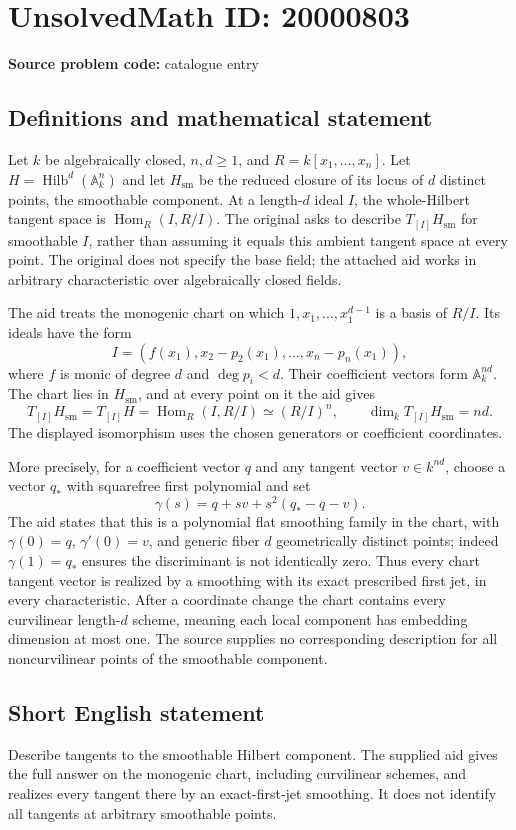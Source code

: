 \documentclass[11pt]{article}
\begin{document}
\section*{UnsolvedMath ID: 20000803}
\textbf{Source problem code:} catalogue entry
\subsection{Definitions and mathematical statement}
Let $k$ be algebraically closed, $n,d\ge1$, and $R=k[x_1,\ldots,x_n]$. Let $H=\operatorname{Hilb}^d(\mathbb A_k^n)$ and let $H_{\mathrm{sm}}$ be the reduced closure of its locus of $d$ distinct points, the smoothable component. At a length-$d$ ideal $I$, the whole-Hilbert tangent space is $\operatorname{Hom}_R(I,R/I)$. The original asks to describe $T_{[I]}H_{\mathrm{sm}}$ for smoothable $I$, rather than assuming it equals this ambient tangent space at every point. The original does not specify the base field; the attached aid works in arbitrary characteristic over algebraically closed fields.

The aid treats the monogenic chart on which $1,x_1,\ldots,x_1^{d-1}$ is a basis of $R/I$. Its ideals have the form
\[
I=(f(x_1),x_2-p_2(x_1),\ldots,x_n-p_n(x_1)),
\]
where $f$ is monic of degree $d$ and $\deg p_i<d$. Their coefficient vectors form $\mathbb A_k^{nd}$. The chart lies in $H_{\mathrm{sm}}$, and at every point on it the aid gives
\[
T_{[I]}H_{\mathrm{sm}}=T_{[I]}H=\operatorname{Hom}_R(I,R/I)\simeq(R/I)^n,
\qquad\dim_k T_{[I]}H_{\mathrm{sm}}=nd.
\]
The displayed isomorphism uses the chosen generators or coefficient coordinates.

More precisely, for a coefficient vector $q$ and any tangent vector $v\in k^{nd}$, choose a vector $q_*$ with squarefree first polynomial and set
\[
\gamma(s)=q+s v+s^2(q_*-q-v).
\]
The aid states that this is a polynomial flat smoothing family in the chart, with $\gamma(0)=q$, $\gamma'(0)=v$, and generic fiber $d$ geometrically distinct points; indeed $\gamma(1)=q_*$ ensures the discriminant is not identically zero. Thus every chart tangent vector is realized by a smoothing with its exact prescribed first jet, in every characteristic. After a coordinate change the chart contains every curvilinear length-$d$ scheme, meaning each local component has embedding dimension at most one. The source supplies no corresponding description for all noncurvilinear points of the smoothable component.
\subsection{Short English statement}
Describe tangents to the smoothable Hilbert component. The supplied aid gives the full answer on the monogenic chart, including curvilinear schemes, and realizes every tangent there by an exact-first-jet smoothing. It does not identify all tangents at arbitrary smoothable points.
\end{document}
